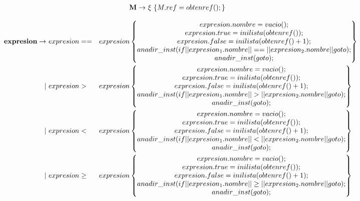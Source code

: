 \documentclass[12pt,a4paper,landscape]{article}
\theoremstyle{mytheor}
\begin{document}
  \begin{alignat*}{2} 
     \text{\textbf{M}} \to\ &\xi\ \{M.ref=obtenref();\}
  \end{alignat*}


\begin{center}
  \begin{alignat*}{2}
     \text{\textbf{expresion}} \to\ &  expresion == && expresion \begin{Bmatrix} expresion.nombre = vacio();\\ expresion.true=inilista(obtenref()); \\  expresion.false=inilista(obtenref()+1);\\ anadir\_inst(if||expresion_1.nombre||==||expresion_2.nombre||goto);\\ anadir\_inst(goto);\end{Bmatrix} \\
    |\ & expresion > && expresion                \begin{Bmatrix} expresion.nombre = vacio();\\ expresion.true=inilista(obtenref()); \\  expresion.false=inilista(obtenref()+1);\\ anadir\_inst(if||expresion_1.nombre||>||expresion_2.nombre||goto);\\ anadir\_inst(goto);\end{Bmatrix} \\
    |\ & expresion < && expresion                   \begin{Bmatrix} expresion.nombre = vacio();\\ expresion.true=inilista(obtenref()); \\  expresion.false=inilista(obtenref()+1);\\ anadir\_inst(if||expresion_1.nombre||<||expresion_2.nombre||goto);\\ anadir\_inst(goto);\end{Bmatrix} \\
        |\ & expresion \geq && expresion                \begin{Bmatrix} expresion.nombre = vacio();\\ expresion.true=inilista(obtenref()); \\  expresion.false=inilista(obtenref()+1);\\ anadir\_inst(if||expresion_1.nombre||\geq||expresion_2.nombre||goto);\\ anadir\_inst(goto);\end{Bmatrix} \\

\end{alignat*}
\end{center}
\end{document}
